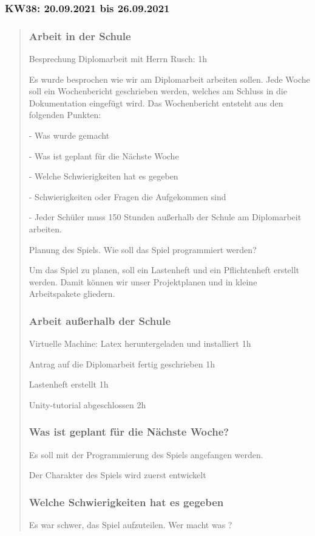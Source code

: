 
\subsubsection{KW38: 20.09.2021 bis 26.09.2021}
\begin{quote}

	\subsubsection*{Arbeit in der Schule}
	Besprechung Diplomarbeit mit Herrn Rusch: 1h
	
	Es wurde besprochen wie wir am Diplomarbeit arbeiten sollen. Jede Woche soll ein Wochenbericht geschrieben werden, welches am Schluss in die Dokumentation eingefügt wird. Das Wochenbericht entsteht aus den folgenden Punkten: 
	
	- Was wurde gemacht
	
	
	- Was ist geplant für die Nächste Woche
	
	
	- Welche Schwierigkeiten hat es gegeben
	
	
	- Schwierigkeiten oder Fragen die Aufgekommen sind
	
	- Jeder Schüler muss 150 Stunden außerhalb der Schule am Diplomarbeit arbeiten.
	
	
	Planung des Spiels. Wie soll das Spiel programmiert werden?
	
	Um das Spiel zu planen, soll ein Lastenheft und ein Pflichtenheft erstellt werden. Damit können wir unser Projektplanen und in kleine Arbeitspakete gliedern.
	
	\subsubsection*{Arbeit außerhalb der Schule}
	Virtuelle Machine: Latex heruntergeladen und installiert 1h
	
	Antrag auf die Diplomarbeit fertig geschrieben 1h
	
	Lastenheft erstellt 1h
	
	Unity-tutorial abgeschlossen 2h
	
	\subsubsection*{Was ist geplant für die Nächste Woche?} 
	Es soll mit der Programmierung des Spiels angefangen werden.
	
	Der Charakter des Spiels wird zuerst entwickelt 
	
	\subsubsection*{Welche Schwierigkeiten hat es gegeben} 
	Es war schwer, das Spiel aufzuteilen. Wer macht was ?
\end{quote}
